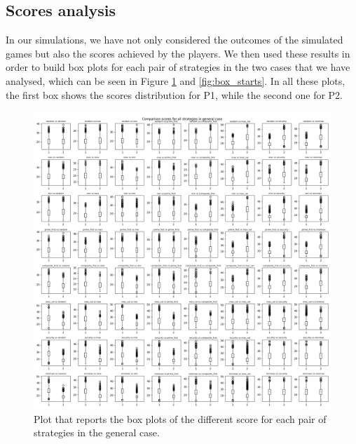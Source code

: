 \subsection{Scores analysis} \label{subsection:scores}

In our simulations, we have not only considered the outcomes of the simulated games but also the scores achieved by the players.
We then used these results in order to build box plots for each pair of strategies in the two cases that we have analysed, which can be seen in Figure \ref{fig:box_general} and \ref{fig:box_starts}. In all these plots, the first box shows the scores distribution for P1, while the second one for P2.

\begin{figure}
	\centering
	\includegraphics[width=1\linewidth]{img/scores_general.png}
	\caption{Plot that reports the box plots of the different score for each pair of strategies in the general case.}
	\label{fig:box_general}
\end{figure}

